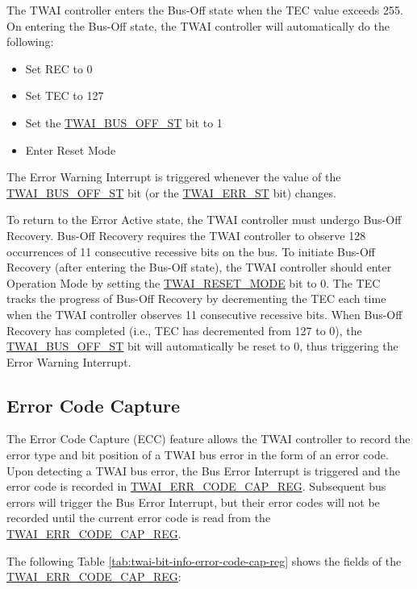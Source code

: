 \documentclass[main\_\_EN.tex]{subfiles}
\begin{document}
The TWAI controller enters the Bus-Off state when the TEC value exceeds 255. On entering the Bus-Off state, the TWAI controller will automatically do the following:

\begin{itemize}
    \item Set REC to 0
    \item Set TEC to 127
    \item Set the \hyperref[fielddesc:TWAIBUSOFFST]{TWAI\_BUS\_OFF\_ST} bit to 1
    \item Enter Reset Mode 
\end{itemize}

The Error Warning Interrupt is triggered whenever the value of the \hyperref[fielddesc:TWAIBUSOFFST]{TWAI\_BUS\_OFF\_ST} bit (or the \hyperref[fielddesc:TWAIERRST]{TWAI\_ERR\_ST} bit) changes.

To return to the Error Active state, the TWAI controller must undergo Bus-Off Recovery. Bus-Off Recovery requires the TWAI controller to observe 128 occurrences of 11 consecutive recessive bits on the bus. To initiate Bus-Off Recovery (after entering the Bus-Off state), the TWAI controller should enter Operation Mode by setting the \hyperref[fielddesc:TWAIRESETMODE]{TWAI\_RESET\_MODE} bit to 0.
The TEC tracks the progress of Bus-Off Recovery by decrementing the TEC each time when the TWAI controller observes 11 consecutive recessive bits. When Bus-Off Recovery has completed (i.e., TEC has decremented from 127 to 0), the \hyperref[fielddesc:TWAIBUSOFFST]{TWAI\_BUS\_OFF\_ST} bit will automatically be reset to 0, thus triggering the Error Warning Interrupt.


\subsection{Error Code Capture}

The Error Code Capture (ECC) feature allows the TWAI controller to record the error type and bit position of a TWAI bus error in the form of an error code. Upon detecting a TWAI bus error, the Bus Error Interrupt is triggered and the error code is recorded in \hyperref[regdesc:TWAIERRCODECAPREG]{TWAI\_ERR\_CODE\_CAP\_REG}. Subsequent bus errors will trigger the Bus Error Interrupt, but their error codes will not be recorded until the current error code is read from the \hyperref[regdesc:TWAIERRCODECAPREG]{TWAI\_ERR\_CODE\_CAP\_REG}.

The following Table \ref{tab:twai-bit-info-error-code-cap-reg} shows the fields of the \hyperref[regdesc:TWAIERRCODECAPREG]{TWAI\_ERR\_CODE\_CAP\_REG}:
\end{document}
